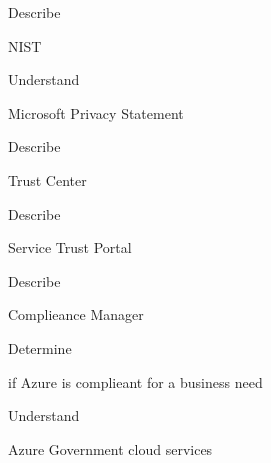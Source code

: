 \documentclass{scrartcl}
\newenvironment{flashcard}[2][]{%
    #1
    \vfill
    \centerline{\Large{#2}}
    \vfill
    \newpage
}
{\newpage}
\begin{document}
    \begin{flashcard}[Describe]{NIST}

    \end{flashcard}

    \begin{flashcard}[Understand]{Microsoft Privacy Statement}

    \end{flashcard}

    \begin{flashcard}[Describe]{Trust Center}

    \end{flashcard}

    \begin{flashcard}[Describe]{Service Trust Portal}

    \end{flashcard}

    \begin{flashcard}[Describe]{Complieance Manager}

    \end{flashcard}

    \begin{flashcard}[Determine]{if Azure is complieant for a business need}

    \end{flashcard}

    \begin{flashcard}[Understand]{Azure Government cloud services}

    \end{flashcard}
\end{document}
